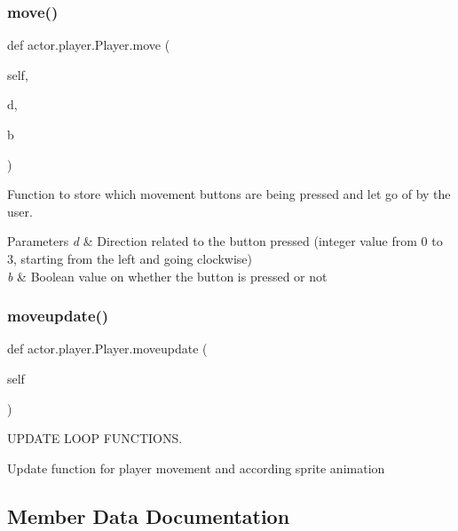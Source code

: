 \subsubsection{\texorpdfstring{move()}{move()}}
{\footnotesize\ttfamily def actor.\+player.\+Player.\+move (\begin{DoxyParamCaption}\item[{}]{self,  }\item[{}]{d,  }\item[{}]{b }\end{DoxyParamCaption})}



Function to store which movement buttons are being pressed and let go of by the user. 


\begin{DoxyParams}{Parameters}
{\em d} & Direction related to the button pressed (integer value from 0 to 3, starting from the left and going clockwise) \\
\hline
{\em b} & Boolean value on whether the button is pressed or not \\
\hline
\end{DoxyParams}
\mbox{\label{classactor_1_1player_1_1_player_a709570fc745642d3ad2764e4d973491b}} 
\subsubsection{\texorpdfstring{moveupdate()}{moveupdate()}}
{\footnotesize\ttfamily def actor.\+player.\+Player.\+moveupdate (\begin{DoxyParamCaption}\item[{}]{self }\end{DoxyParamCaption})}



U\+P\+D\+A\+TE L\+O\+OP F\+U\+N\+C\+T\+I\+O\+NS. 

Update function for player movement and according sprite animation 

\subsection{Member Data Documentation}
\mbox{\label{classactor_1_1player_1_1_player_a479ddb8958705d9cbd7830e9ba59f8c5}} 
